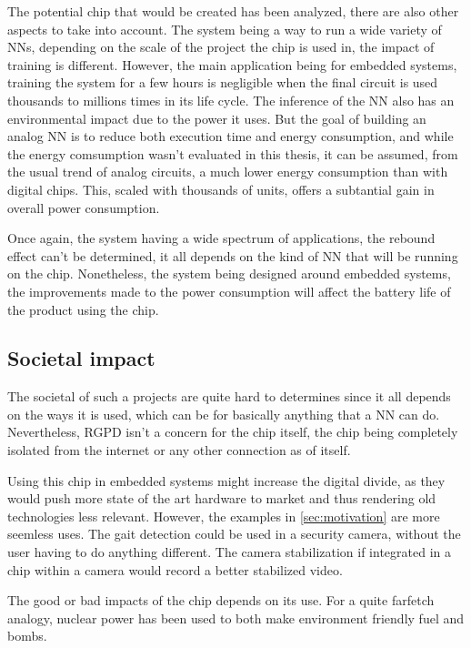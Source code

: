 The potential chip that would be created has been analyzed, there are also other aspects to take into account. The system being a way to run a wide variety of \acp{NN}, depending on the scale of the project the chip is used in, the impact of training is different. However, the main application being for embedded systems, training the system for a few hours is negligible when the final circuit is used thousands to millions times in its life cycle.
The inference of the \ac{NN} also has an environmental impact due to the power it uses. But the goal of building an analog \ac{NN} is to reduce both execution time and energy consumption, and while the energy comsumption wasn't evaluated in this thesis, it can be assumed, from the usual trend of analog circuits, a much lower energy consumption than with digital chips. This, scaled with thousands of units, offers a subtantial gain in overall power consumption.

Once again, the system having a wide spectrum of applications, the rebound effect can't be determined, it all depends on the kind of \ac{NN} that will be running on the chip. Nonetheless, the system being designed around embedded systems, the improvements made to the power consumption will affect the battery life of the product using the chip.

\subsection{Societal impact}

The societal of such a projects are quite hard to determines since it all depends on the ways it is used, which can be for basically anything that a \ac{NN} can do. Nevertheless, RGPD isn't a concern for the chip itself, the chip being completely isolated from the internet or any other connection as of itself.

Using this chip in embedded systems might increase the digital divide, as they would push more state of the art hardware to market and thus rendering old technologies less relevant. However, the examples in \cref{sec:motivation} are more seemless uses. The gait detection \cite{gaitDS,gaitDig,gait} could be used in a security camera, without the user having to do anything different. The camera stabilization \cite{videoStab} if integrated in a chip within a camera would record a better stabilized video.

The good or bad impacts of the chip depends on its use. For a quite farfetch analogy, nuclear power has been used to both make environment friendly fuel and bombs.

